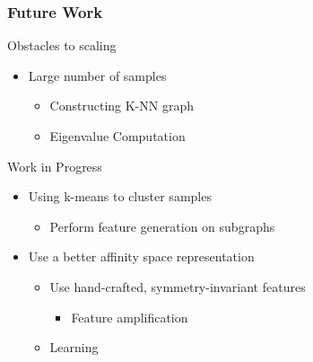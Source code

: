 \begin{frame}
\frametitle{Future Work} 
Obstacles to scaling
    \begin{itemize}
    \item Large number of samples
            \begin{itemize}
            \item Constructing K-NN graph
            \item Eigenvalue Computation
            \end{itemize} 
    \end{itemize} 

Work in Progress
    \begin{itemize}
    \item Using k-means to cluster samples
            \begin{itemize}
            \item Perform feature generation on subgraphs
            \end{itemize}
    \item Use a better affinity space representation
            \begin{itemize}
            \item Use hand-crafted, symmetry-invariant features
                \begin{itemize}
                \item Feature amplification
                \end{itemize}
            \item Learning
            \end{itemize}
    \end{itemize}
\end{frame}
